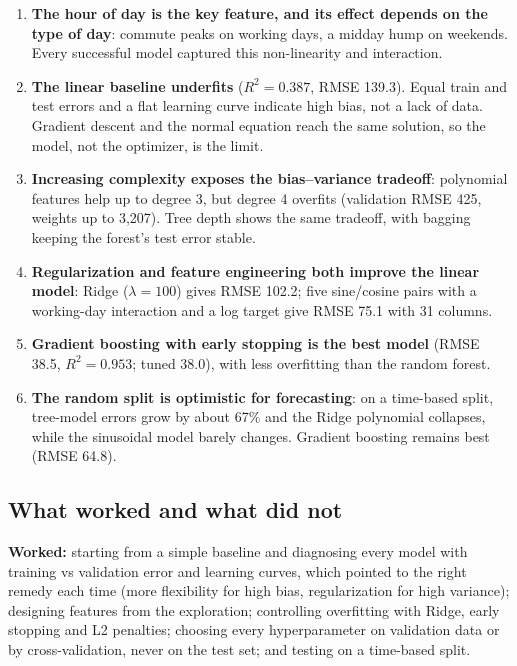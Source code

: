 \documentclass[11pt]{article}
\begin{document}
\begin{enumerate}
  \item \textbf{The hour of day is the key feature, and its effect depends on the type of day}: commute peaks
        on working days, a midday hump on weekends. Every successful model captured this non-linearity and interaction.
  \item \textbf{The linear baseline underfits} ($R^2 = 0.387$, RMSE 139.3). Equal train and test errors and a
        flat learning curve indicate high bias, not a lack of data. Gradient descent and the normal equation reach
        the same solution, so the model, not the optimizer, is the limit.
  \item \textbf{Increasing complexity exposes the bias--variance tradeoff}: polynomial features help up to degree 3,
        but degree 4 overfits (validation RMSE 425, weights up to 3,207). Tree depth shows the same tradeoff, with
        bagging keeping the forest's test error stable.
  \item \textbf{Regularization and feature engineering both improve the linear model}: Ridge ($\lambda=100$) gives RMSE
        102.2; five sine/cosine pairs with a working-day interaction and a log target give RMSE 75.1 with 31 columns.
  \item \textbf{Gradient boosting with early stopping is the best model} (RMSE 38.5, $R^2 = 0.953$; tuned 38.0),
        with less overfitting than the random forest.
  \item \textbf{The random split is optimistic for forecasting}: on a time-based split, tree-model errors grow by
        about 67\% and the Ridge polynomial collapses, while the sinusoidal model barely changes. Gradient boosting
        remains best (RMSE 64.8).
\end{enumerate}

\subsection{What worked and what did not}

\textbf{Worked:} starting from a simple baseline and diagnosing every model with training vs validation
error and learning curves, which pointed to the right remedy each time (more flexibility for high bias,
regularization for high variance); designing features from the exploration; controlling overfitting with
Ridge, early stopping and L2 penalties; choosing every hyperparameter on validation data or by
cross-validation, never on the test set; and testing on a time-based split.
\end{document}

